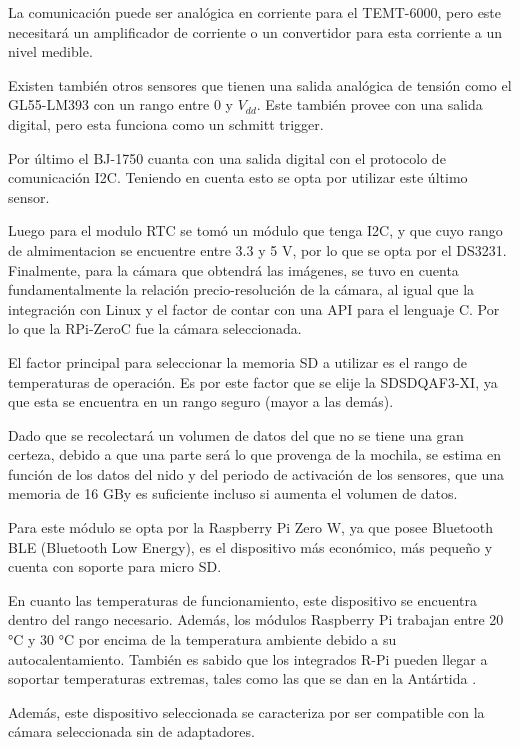 La comunicación puede ser analógica en corriente para el TEMT-6000, pero este necesitará un amplificador de corriente o un convertidor para esta corriente a un nivel medible.

Existen también otros sensores que tienen una salida analógica de tensión como el GL55-LM393 con un rango entre 0 y $V_{dd}$. Este también provee con una salida digital, pero esta funciona como un schmitt trigger.

Por último el BJ-1750 cuanta con una salida digital con el protocolo de comunicación I2C. Teniendo en cuenta esto se opta por utilizar este último sensor. 

Luego para el modulo RTC se tom\'o un  m\'odulo que tenga I2C, y que cuyo rango de almimentacion se encuentre entre 3.3 y 5 V, por lo que se opta por el DS3231.
Finalmente, para la cámara que obtendrá las imágenes, se tuvo en cuenta fundamentalmente la relación precio-resolución de la cámara, al igual que la integración con Linux y el factor de contar con una API para el lenguaje C. Por lo que la RPi-ZeroC fue la cámara seleccionada.



El factor principal para seleccionar la memoria SD a utilizar es el rango de temperaturas de operación. Es por este factor que se elije la SDSDQAF3-XI, ya que esta se encuentra en un rango seguro (mayor a las demás).

Dado que se recolectará un volumen de datos del que no se tiene una gran certeza, debido a que una parte será lo que provenga de la mochila, se estima en función de los datos del nido y del periodo de activación de los sensores, que una memoria de 16 GBy es suficiente incluso si aumenta el volumen de datos.


Para este módulo se opta por la Raspberry Pi Zero W, ya que posee Bluetooth BLE (Bluetooth Low Energy), es el dispositivo más económico, más pequeño y cuenta con soporte para micro SD.

En cuanto las temperaturas de funcionamiento, este dispositivo se encuentra dentro del rango necesario. Además, los módulos Raspberry Pi trabajan entre 20 °C y 30 °C por encima de la temperatura ambiente debido a su autocalentamiento. También es sabido que los integrados R-Pi pueden llegar a soportar temperaturas extremas, tales como las que se dan en la Antártida \cite{ref:Penguin}.

Además, este dispositivo seleccionada se caracteriza por ser compatible con la cámara seleccionada sin  de adaptadores.

